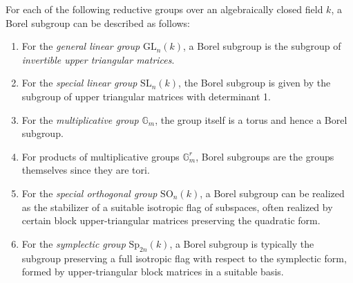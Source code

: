 \begin{example}
For each of the following reductive groups over an algebraically closed field $k$, a Borel subgroup can be described as follows:
\begin{enumerate}
    \item For the \emph{general linear group} $\mathrm{GL}_n(k)$, a Borel subgroup is the subgroup of \emph{invertible upper triangular matrices}.
    \item For the \emph{special linear group} $\mathrm{SL}_n(k)$, the Borel subgroup is given by the subgroup of upper triangular matrices with determinant 1.
    \item For the \emph{multiplicative group} $\mathbb{G}_m$, the group itself is a torus and hence a Borel subgroup.
    \item For products of multiplicative groups $\mathbb{G}_m^r$, Borel subgroups are the groups themselves since they are tori.
    \item For the \emph{special orthogonal group} $\mathrm{SO}_n(k)$, a Borel subgroup can be realized as the stabilizer of a suitable isotropic flag of subspaces, often realized by certain block upper-triangular matrices preserving the quadratic form.
    \item For the \emph{symplectic group} $\mathrm{Sp}_{2n}(k)$, a Borel subgroup is typically the subgroup preserving a full isotropic flag with respect to the symplectic form, formed by upper-triangular block matrices in a suitable basis.
\end{enumerate}
\end{example}

